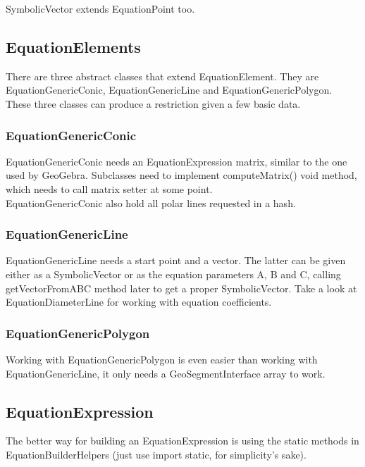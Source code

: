 \documentclass[12pt, oneside, a4paper]{article}
\begin{document}
SymbolicVector extends EquationPoint too.

\subsection{EquationElements}

There are three abstract classes that extend EquationElement. They are
EquationGenericConic, EquationGenericLine and
EquationGenericPolygon.\\

These three classes can produce a restriction given a few basic data.

\subsubsection{EquationGenericConic}

EquationGenericConic needs an EquationExpression matrix, similar to
the one used by GeoGebra. Subclasses need to implement computeMatrix()
void method, which needs to call matrix setter at some point.\\

EquationGenericConic also hold all polar lines requested in a hash.

\subsubsection{EquationGenericLine}

EquationGenericLine needs a start point and a vector. The latter can
be given either as a SymbolicVector or as the equation parameters A, B
and C, calling getVectorFromABC method later to get a proper
SymbolicVector. Take a look at EquationDiameterLine for working with
equation coefficients.

\subsubsection{EquationGenericPolygon}

Working with EquationGenericPolygon is even easier than working with
EquationGenericLine, it only needs a GeoSegmentInterface array to
work.

\subsection{EquationExpression}

The better way for building an EquationExpression is using the static
methods in EquationBuilderHelpers (just use import static, for
simplicity's sake).\\
\end{document}
